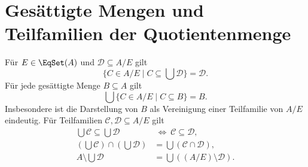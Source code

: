 \section{Gesättigte Mengen und Teilfamilien der Quotientenmenge}

\begin{theorem}
\label{b11guide:thm:subfamilies}
Für $E\in\EqSet(A)$ und $\mathcal D\subseteq A/E$ gilt
\[
 \{C\in A/E\mid C\subseteq\bigcup\mathcal D\}=\mathcal D.
\]
Für jede gesättigte Menge $B\subseteq A$ gilt
\[
 \bigcup\{C\in A/E\mid C\subseteq B\}=B.
\]
Insbesondere ist die Darstellung von $B$ als Vereinigung
einer Teilfamilie von $A/E$ eindeutig. Für Teilfamilien
$\mathcal C,\mathcal D\subseteq A/E$ gilt
\[
\begin{aligned}
 \bigcup\mathcal C\subseteq\bigcup\mathcal D
     &\ \Longleftrightarrow\ \mathcal C\subseteq\mathcal D,\\
 (\bigcup\mathcal C)\cap(\bigcup\mathcal D)
     &=\bigcup(\mathcal C\cap\mathcal D),\\
 A\setminus\bigcup\mathcal D
     &=\bigcup((A/E)\setminus\mathcal D).
\end{aligned}
\]
\end{theorem}

